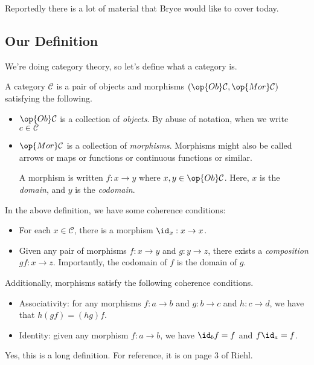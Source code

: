 







Reportedly there is a lot of material that Bryce would like to cover today.

\subsection{Our Definition}
We're doing category theory, so let's define what a category is.
\begin{definition}[Category]
	A category $\mathcal C$ is a pair of objects and morphisms $(\op{Ob}\mathcal C,\op{Mor}\mathcal C)$ satisfying the following.
	\begin{itemize}
		\item $\op{Ob}\mathcal C$ is a collection of \textit{objects}. By abuse of notation, when we write $c\in\mathcal C$ 
		\item $\op{Mor}\mathcal C$ is a collection of \textit{morphisms}. Morphisms might also be called arrows or maps or functions or continuous functions or similar.

		A morphism is written $f:x\to y$ where $x,y\in\op{Ob}\mathcal C$. Here, $x$ is the \textit{domain}, and $y$ is the \textit{codomain}.
	\end{itemize}
\end{definition}
In the above definition, we have some coherence conditions:
\begin{itemize}
	\item For each $x\in\mathcal C$, there is a morphism $\id_x:x\to x$.
	\item Given any pair of morphisms $f:x\to y$ and $g:y\to z$, there exists a \textit{composition} $gf:x\to z$. Importantly, the codomain of $f$ is the domain of $g$.
\end{itemize}
Additionally, morphisms satisfy the following coherence conditions.
\begin{itemize}
	\item Associativity: for any morphisms $f:a\to b$ and $g:b\to c$ and $h:c\to d$, we have that $h(gf)=(hg)f$.
	\item Identity: given any morphism $f:a\to b$, we have $\id_bf=f$ and $f\id_a=f$.
\end{itemize}
Yes, this is a long definition. For reference, it is on page 3 of Riehl.

